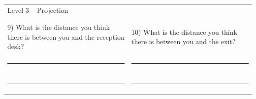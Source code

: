 \begin{table}[!htb]
\begin{tabular}{p{0.5\linewidth} p{0.5\linewidth}}
    \end{tabular}
    \begin{tabular}{p{0.5\linewidth} p{0.5\linewidth}}
        \large{Level 3 – Projection}  &\\
        & \\
        & \\
        9)	What is the distance you think there is between you and the reception desk? & 10) What is the distance you think there is between you and the exit? \\
        & \\
        \rule{\linewidth}{.2mm} & \rule{\linewidth}{.2mm}\\
        & \\
        \rule{\linewidth}{.2mm} & \rule{\linewidth}{.2mm}\\
        & \\
    \end{tabular}
\end{table}

\FloatBarrier
\pagebreak

